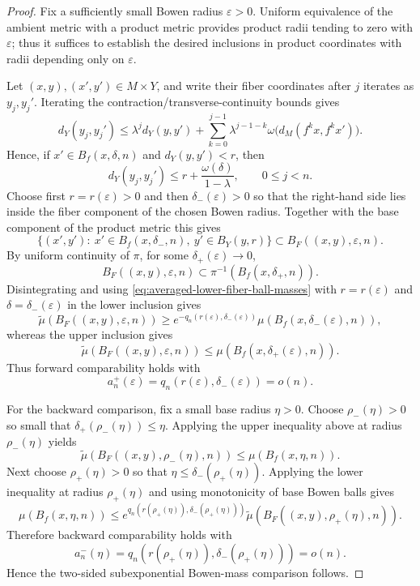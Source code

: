 \documentclass[10pt,a4paper]{amsart}
\newcommand{\eps}{\varepsilon}
\begin{document}
\begin{proof}
Fix a sufficiently small Bowen radius $\eps>0$. Uniform equivalence of the
ambient metric with a product metric provides product radii tending to zero
with $\eps$; thus it suffices to establish the desired inclusions in product
coordinates with radii depending only on $\eps$.

Let $(x,y),(x',y')\in M\times Y$, and write their fiber coordinates after $j$
iterates as $y_j,y_j'$. Iterating the contraction/transverse-continuity bounds
gives
\[
d_Y(y_j,y_j')
\le \lambda^j d_Y(y,y')
+\sum_{k=0}^{j-1}\lambda^{j-1-k}
\omega\bigl(d_M(f^kx,f^kx')\bigr).
\]
Hence, if $x'\in B_f(x,\delta,n)$ and $d_Y(y,y')<r$, then
\[
d_Y(y_j,y_j')
\le r+\frac{\omega(\delta)}{1-\lambda},
\qquad 0\le j<n.
\]
Choose first $r=r(\eps)>0$ and then $\delta_-(\eps)>0$ so that the right-hand
side lies inside the fiber component of the chosen Bowen radius. Together with
the base component of the product metric this gives
\begin{equation}
\label{eq:skew-product-lower-inclusion}
\bigl\{(x',y'):\ x'\in B_f(x,\delta_-,n),\
 y'\in B_Y(y,r)\bigr\}
\subset B_F((x,y),\eps,n).
\end{equation}
By uniform continuity of $\pi$, for some $\delta_+(\eps)\to0$,
\begin{equation}
\label{eq:skew-product-upper-inclusion}
B_F((x,y),\eps,n)
\subset \pi^{-1}(B_f(x,\delta_+,n)).
\end{equation}
Disintegrating and using
\eqref{eq:averaged-lower-fiber-ball-masses} with
$r=r(\eps)$ and $\delta=\delta_-(\eps)$ in the lower inclusion gives
\[
\widetilde\mu(B_F((x,y),\eps,n))
\ge e^{-q_n(r(\eps),\delta_-(\eps))}
\mu(B_f(x,\delta_-(\eps),n)),
\]
whereas the upper inclusion gives
\[
\widetilde\mu(B_F((x,y),\eps,n))
\le \mu(B_f(x,\delta_+(\eps),n)).
\]
Thus forward comparability holds with
\[
a_n^+(\eps)=q_n(r(\eps),\delta_-(\eps))=o(n).
\]

For the backward comparison, fix a small base radius $\eta>0$. Choose
$\rho_-(\eta)>0$ so small that
$\delta_+(\rho_-(\eta))\le\eta$. Applying the upper inequality above at radius
$\rho_-(\eta)$ yields
\[
\widetilde\mu(B_F((x,y),\rho_-(\eta),n))
\le \mu(B_f(x,\eta,n)).
\]
Next choose $\rho_+(\eta)>0$ so that
$\eta\le\delta_-(\rho_+(\eta))$. Applying the lower inequality at radius
$\rho_+(\eta)$ and using monotonicity of base Bowen balls gives
\[
\mu(B_f(x,\eta,n))
\le e^{q_n(r(\rho_+(\eta)),\delta_-(\rho_+(\eta)))}
\widetilde\mu(B_F((x,y),\rho_+(\eta),n)).
\]
Therefore backward comparability holds with
\[
a_n^-(\eta)
=q_n(r(\rho_+(\eta)),\delta_-(\rho_+(\eta)))=o(n).
\]
Hence the two-sided subexponential Bowen-mass comparison follows.
\end{proof}
\end{document}
